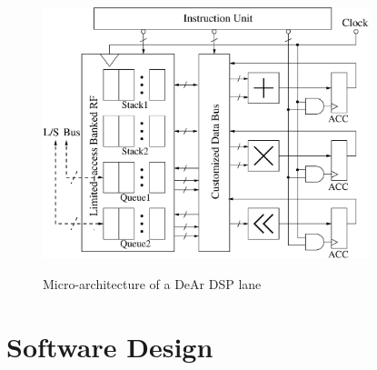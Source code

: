         


        \begin{figure}[!ht] 
            \caption{Micro-architecture of a DeAr DSP lane}
            \centering
            \includegraphics[width=0.85\textwidth]{./figs/micro.eps}
            \label{fig:micro}
        \end{figure}
    \section{Software Design}
            \label{sec:swdesign}
